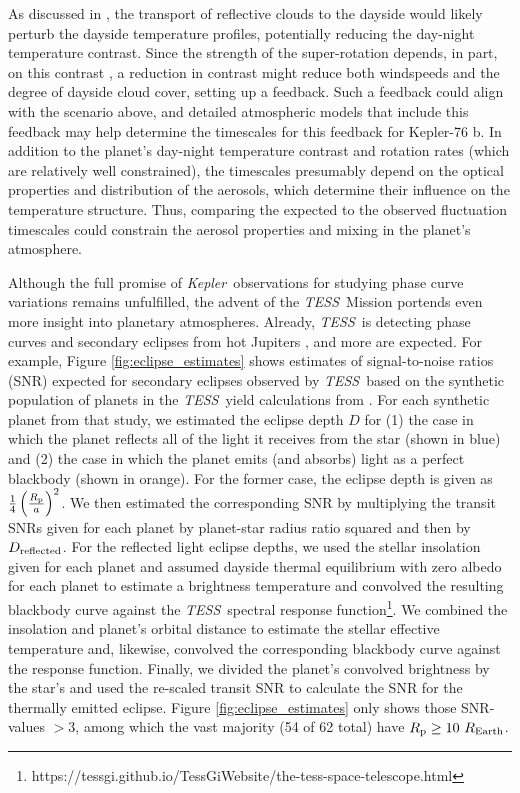 \documentclass[manuscript]{aastex62}
\newcommand{\kepler}{{\it Kepler}}
\newcommand{\tess}{{\it TESS}}
\begin{document}
As discussed in \citet{2016NatAs...1E...4A}, the transport of reflective clouds to the dayside would likely perturb the dayside temperature profiles, potentially reducing the day-night temperature contrast. Since the strength of the super-rotation depends, in part, on this contrast \citep{2011ApJ...738...71S}, a reduction in contrast might reduce both windspeeds and the degree of dayside cloud cover, setting up a feedback. Such a feedback could align with the scenario above, and detailed atmospheric models that include this feedback may help determine the timescales for this feedback for Kepler-76 b. In addition to the planet's day-night temperature contrast and rotation rates (which are relatively well constrained), the timescales presumably depend on the optical properties and distribution of the aerosols, which determine their influence on the temperature structure. Thus, comparing the expected to the observed fluctuation timescales could constrain the aerosol properties and mixing in the planet's atmosphere.

Although the full promise of \kepler\ observations for studying phase curve variations remains unfulfilled, the advent of the \tess\ Mission portends even more insight into planetary atmospheres. Already, \tess\  is detecting phase curves and secondary eclipses from hot Jupiters \citep{2018arXiv181106020S}, and more are expected. For example, Figure \ref{fig:eclipse_estimates} shows estimates of signal-to-noise ratios (SNR) expected for secondary eclipses observed by \tess\ based on the synthetic population of planets in the \tess\ yield calculations from \citet{2018ApJS..239....2B}. For each synthetic planet from that study, we estimated the eclipse depth $D$ for (1) the case in which the planet reflects all of the light it receives from the star (shown in blue) and (2) the case in which the planet emits (and absorbs) light as a perfect blackbody (shown in orange). For the former case, the eclipse depth is given as $\frac{1}{4} \left( \frac{R_{\rm p}}{a} \right)^2$. We then estimated the corresponding SNR by multiplying the transit SNRs given for each planet by planet-star radius ratio squared and then by $D_{\rm reflected}$. For the reflected light eclipse depths, we used the stellar insolation given for each planet and assumed dayside thermal equilibrium with zero albedo for each planet to estimate a brightness temperature and convolved the resulting blackbody curve against the \tess\ spectral response function\footnote{https://tessgi.github.io/TessGiWebsite/the-tess-space-telescope.html}. We combined the insolation and planet's orbital distance to estimate the stellar effective temperature and, likewise, convolved the corresponding blackbody curve against the response function. Finally, we divided the planet's convolved brightness by the star's and used the re-scaled transit SNR to calculate the SNR for the thermally emitted eclipse. Figure \ref{fig:eclipse_estimates} only shows those SNR-values $> 3$, among which the vast majority (54 of 62 total) have $R_{\rm p} \geq 10\ R_{\rm Earth}$.
\end{document}
